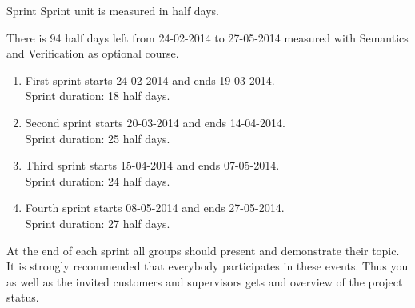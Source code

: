 Sprint
Sprint unit is measured in half days.

There is 94 half days left from 24-02-2014 to 27-05-2014 measured with Semantics and Verification as optional course.

\begin{enumerate}
\item First sprint starts 24-02-2014 and ends 19-03-2014.\\
Sprint duration: 18 half days.
\item Second sprint starts 20-03-2014 and ends 14-04-2014.\\
Sprint duration: 25 half days.
\item Third sprint starts 15-04-2014 and ends 07-05-2014.\\
Sprint duration: 24 half days.
\item Fourth sprint starts 08-05-2014 and ends 27-05-2014.\\
Sprint duration: 27 half days.
\end{enumerate}

At the end of each sprint all groups should present and demonstrate their topic.
It is strongly recommended that everybody participates in these events. Thus you as well as the invited customers and supervisors gets and overview of the project status.